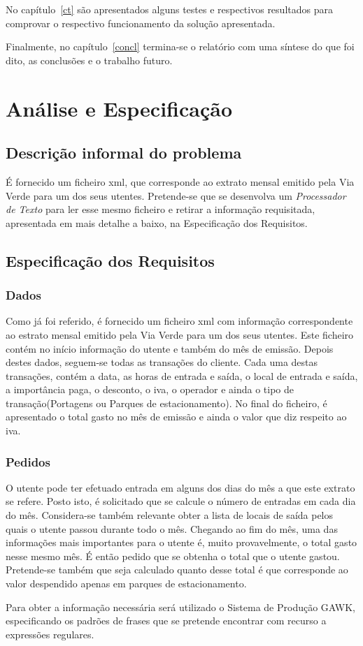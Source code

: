\documentclass{report}
\def\pt{\emph{Processador de Texto}\xspace}
\begin{document}
No capítulo~\ref{ct} são apresentados alguns testes e respectivos resultados para comprovar o respectivo funcionamento da solução apresentada.

Finalmente, no capítulo~\ref{concl} termina-se o relatório com uma síntese do que foi dito, as conclusões e o trabalho futuro.

\chapter{Análise e Especificação} \label{ae}
\section{Descrição informal do problema}
É fornecido um ficheiro xml, que corresponde ao extrato mensal emitido pela Via Verde para um dos seus utentes. 
Pretende-se que se desenvolva um \pt para ler esse mesmo ficheiro e retirar a informação requisitada, apresentada 
em mais detalhe a baixo, na Especificação dos Requisitos.
\section{Especificação dos Requisitos}
\subsection{Dados}
Como já foi referido, é fornecido um ficheiro xml com informação correspondente ao estrato mensal emitido 
pela Via Verde para um dos seus utentes.
Este ficheiro contém no início informação do utente e também do mês
de emissão. 
Depois destes dados, seguem-se todas as transações do cliente.
Cada uma destas transações, contém a data, as horas de entrada e saída, o
local de entrada e saída, a importância paga, o desconto, o iva, o operador
e ainda o tipo de transação(Portagens ou Parques de estacionamento).
No final do ficheiro, é apresentado o total gasto no mês de emissão e ainda
o valor que diz respeito ao iva.
\subsection{Pedidos}
O utente pode ter efetuado entrada em alguns dos dias do mês a que este extrato se refere. 
Posto isto, é solicitado que se calcule o número de entradas em cada dia do mês.
Considera-se também relevante obter a lista de locais de saída pelos quais o utente passou durante todo o mês.
Chegando ao fim do mês, uma das informações mais importantes para o utente é, muito provavelmente, o total gasto nesse mesmo mês. 
É então pedido que se obtenha o total que o utente gastou. Pretende-se também que seja calculado quanto desse total é que corresponde 
ao valor despendido apenas em parques de estacionamento.\par
Para obter a informação necessária será utilizado o Sistema de Produção GAWK, especificando os padrões de frases que se pretende encontrar com recurso a expressões regulares.
\end{document}
